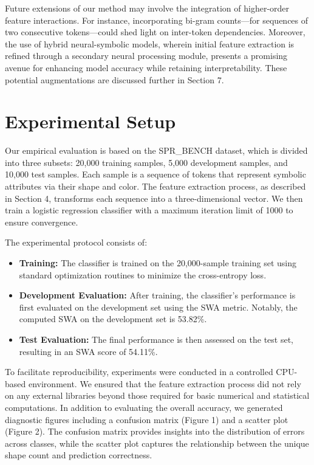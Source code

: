 \documentclass{article}
\begin{document}
Future extensions of our method may involve the integration of higher-order feature interactions. For instance, incorporating bi-gram counts—for sequences of two consecutive tokens—could shed light on inter-token dependencies. Moreover, the use of hybrid neural-symbolic models, wherein initial feature extraction is refined through a secondary neural processing module, presents a promising avenue for enhancing model accuracy while retaining interpretability. These potential augmentations are discussed further in Section 7.

\section{Experimental Setup}
Our empirical evaluation is based on the SPR\_BENCH dataset, which is divided into three subsets: 20,000 training samples, 5,000 development samples, and 10,000 test samples. Each sample is a sequence of tokens that represent symbolic attributes via their shape and color. The feature extraction process, as described in Section 4, transforms each sequence into a three-dimensional vector. We then train a logistic regression classifier with a maximum iteration limit of 1000 to ensure convergence.

The experimental protocol consists of:
\begin{itemize}
    \item \textbf{Training:} The classifier is trained on the 20,000-sample training set using standard optimization routines to minimize the cross-entropy loss.
    \item \textbf{Development Evaluation:} After training, the classifier’s performance is first evaluated on the development set using the SWA metric. Notably, the computed SWA on the development set is 53.82\%.
    \item \textbf{Test Evaluation:} The final performance is then assessed on the test set, resulting in an SWA score of 54.11\%.
\end{itemize}

To facilitate reproducibility, experiments were conducted in a controlled CPU-based environment. We ensured that the feature extraction process did not rely on any external libraries beyond those required for basic numerical and statistical computations. In addition to evaluating the overall accuracy, we generated diagnostic figures including a confusion matrix (Figure 1) and a scatter plot (Figure 2). The confusion matrix provides insights into the distribution of errors across classes, while the scatter plot captures the relationship between the unique shape count and prediction correctness.
\end{document}
